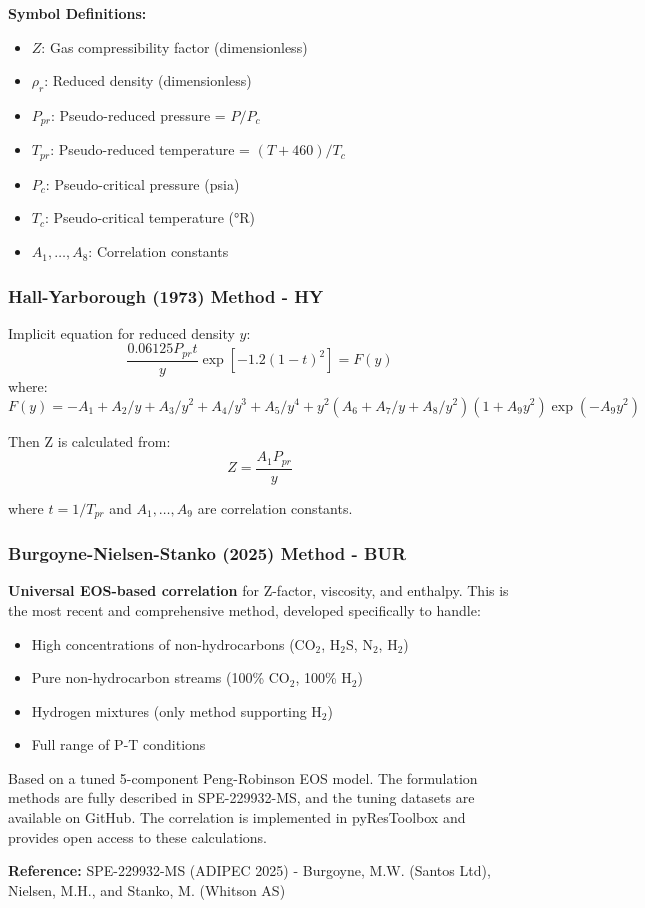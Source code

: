 \documentclass[11pt,a4paper]{article}
\newcommand{\symitem}[2]{\item \textbf{#1}: #2}
\begin{document}
\textbf{Symbol Definitions:}
\begin{itemize}[leftmargin=2cm]
\symitem{$Z$}{Gas compressibility factor (dimensionless)}
\symitem{$\rho_r$}{Reduced density (dimensionless)}
\symitem{$P_{pr}$}{Pseudo-reduced pressure = $P/P_c$}
\symitem{$T_{pr}$}{Pseudo-reduced temperature = $(T+460)/T_c$}
\symitem{$P_c$}{Pseudo-critical pressure (psia)}
\symitem{$T_c$}{Pseudo-critical temperature (°R)}
\symitem{$A_1, \ldots, A_8$}{Correlation constants}
\end{itemize}

\subsubsection{Hall-Yarborough (1973) Method - HY}

\begin{tcolorbox}[colback=formulabox,colframe=black!75]
Implicit equation for reduced density $y$:
\begin{equation}
\frac{0.06125 P_{pr} t}{y} \exp\left[-1.2(1-t)^2\right] = F(y)
\end{equation}
where:
\begin{equation}
F(y) = -A_1 + A_2/y + A_3/y^2 + A_4/y^3 + A_5/y^4 + y^2(A_6 + A_7/y + A_8/y^2)(1 + A_9y^2)\exp(-A_9y^2)
\end{equation}

Then Z is calculated from:
\begin{equation}
Z = \frac{A_1 P_{pr}}{y}
\end{equation}

where $t = 1/T_{pr}$ and $A_1, \ldots, A_9$ are correlation constants.
\end{tcolorbox}

\subsubsection{Burgoyne-Nielsen-Stanko (2025) Method - BUR}

\begin{tcolorbox}[colback=formulabox,colframe=black!75]
\textbf{Universal EOS-based correlation} for Z-factor, viscosity, and enthalpy. This is the most recent and comprehensive method, developed specifically to handle:
\begin{itemize}
\item High concentrations of non-hydrocarbons (CO$_2$, H$_2$S, N$_2$, H$_2$)
\item Pure non-hydrocarbon streams (100\% CO$_2$, 100\% H$_2$)
\item Hydrogen mixtures (only method supporting H$_2$)
\item Full range of P-T conditions
\end{itemize}

Based on a tuned 5-component Peng-Robinson EOS model. The formulation methods are fully described in SPE-229932-MS, and the tuning datasets are available on GitHub. The correlation is implemented in pyResToolbox and provides open access to these calculations.

\textbf{Reference:} SPE-229932-MS (ADIPEC 2025) - Burgoyne, M.W. (Santos Ltd), Nielsen, M.H., and Stanko, M. (Whitson AS)
\end{tcolorbox}
\end{document}

